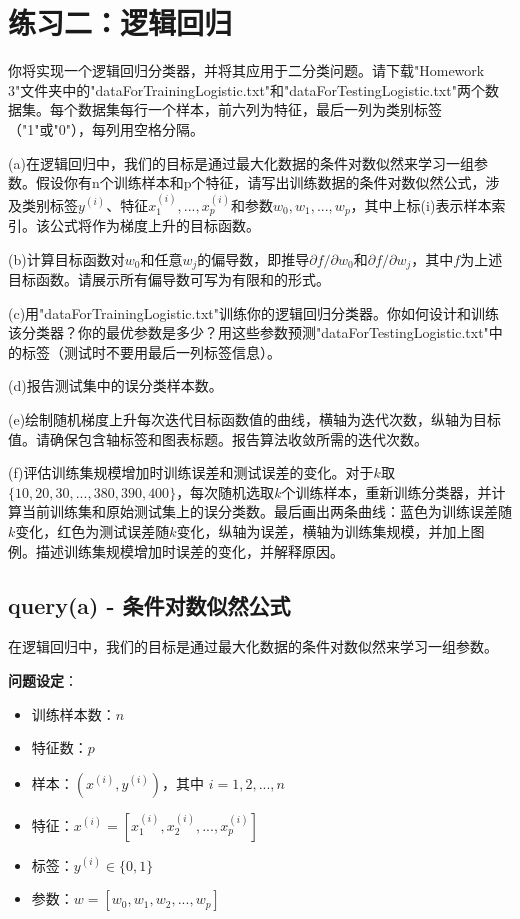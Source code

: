 \documentclass[a4paper]{article}
\begin{document}
\section{练习二：逻辑回归}
\begin{flushleft}
你将实现一个逻辑回归分类器，并将其应用于二分类问题。请下载"Homework 3"文件夹中的"dataForTrainingLogistic.txt"和"dataForTestingLogistic.txt"两个数据集。每个数据集每行一个样本，前六列为特征，最后一列为类别标签（"1"或"0"），每列用空格分隔。

(a)在逻辑回归中，我们的目标是通过最大化数据的条件对数似然来学习一组参数。假设你有n个训练样本和p个特征，请写出训练数据的条件对数似然公式，涉及类别标签$y^{(i)}$、特征$x_1^{(i)}, ..., x_p^{(i)}$和参数$w_0, w_1, ..., w_p$，其中上标(i)表示样本索引。该公式将作为梯度上升的目标函数。

(b)计算目标函数对$w_0$和任意$w_j$的偏导数，即推导$\partial f/\partial w_0$和$\partial f/\partial w_j$，其中$f$为上述目标函数。请展示所有偏导数可写为有限和的形式。

(c)用"dataForTrainingLogistic.txt"训练你的逻辑回归分类器。你如何设计和训练该分类器？你的最优参数是多少？用这些参数预测"dataForTestingLogistic.txt"中的标签（测试时不要用最后一列标签信息）。

(d)报告测试集中的误分类样本数。

(e)绘制随机梯度上升每次迭代目标函数值的曲线，横轴为迭代次数，纵轴为目标值。请确保包含轴标签和图表标题。报告算法收敛所需的迭代次数。

(f)评估训练集规模增加时训练误差和测试误差的变化。对于$k$取$\{10, 20, 30, ..., 380, 390, 400\}$，每次随机选取$k$个训练样本，重新训练分类器，并计算当前训练集和原始测试集上的误分类数。最后画出两条曲线：蓝色为训练误差随$k$变化，红色为测试误差随$k$变化，纵轴为误差，横轴为训练集规模，并加上图例。描述训练集规模增加时误差的变化，并解释原因。
\end{flushleft}

\subsection{query(a) - 条件对数似然公式}

在逻辑回归中，我们的目标是通过最大化数据的条件对数似然来学习一组参数。

\textbf{问题设定}：
\begin{itemize}
    \item 训练样本数：$n$
    \item 特征数：$p$
    \item 样本：$(x^{(i)}, y^{(i)})$，其中 $i = 1, 2, ..., n$
    \item 特征：$x^{(i)} = [x_1^{(i)}, x_2^{(i)}, ..., x_p^{(i)}]$
    \item 标签：$y^{(i)} \in \{0, 1\}$
    \item 参数：$w = [w_0, w_1, w_2, ..., w_p]$
\end{itemize}
\end{document}
